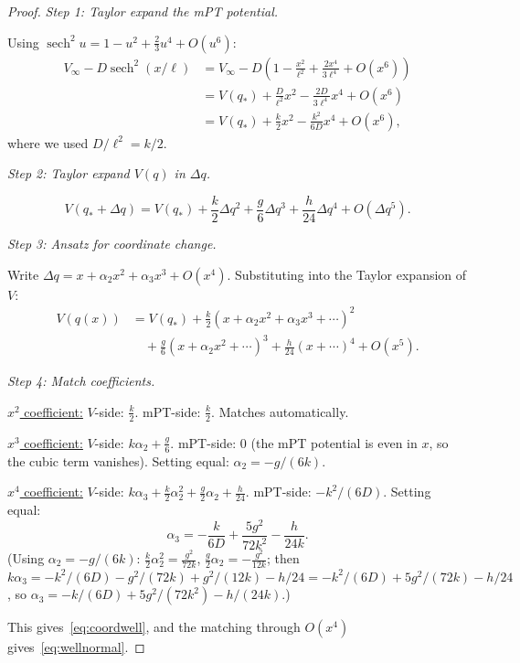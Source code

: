 \documentclass[12pt]{article}
\theoremstyle{plain}
\theoremstyle{definition}
\numberwithin{equation}{section}
\DeclareMathOperator{\sech}{sech}
\begin{document}
\begin{proof}
\emph{Step 1: Taylor expand the mPT potential.}

Using $\sech^2 u=1-u^2+\frac{2}{3}u^4+O(u^6)$:
\begin{align}
V_\infty-D\sech^2(x/\ell)
&= V_\infty-D\left(1-\frac{x^2}{\ell^2}
+\frac{2x^4}{3\ell^4}+O(x^6)\right)\\
&= V(q_*)+\frac{D}{\ell^2}x^2
-\frac{2D}{3\ell^4}x^4+O(x^6)\\
&= V(q_*)+\frac{k}{2}x^2-\frac{k^2}{6D}x^4+O(x^6),
\end{align}
where we used $D/\ell^2=k/2$.

\emph{Step 2: Taylor expand $V(q)$ in $\Delta q$.}

\begin{equation}
V(q_*+\Delta q) = V(q_*)+\frac{k}{2}\Delta q^2
+\frac{g}{6}\Delta q^3+\frac{h}{24}\Delta q^4+O(\Delta q^5).
\end{equation}

\emph{Step 3: Ansatz for coordinate change.}

Write $\Delta q=x+\alpha_2 x^2+\alpha_3 x^3+O(x^4)$.
Substituting into the Taylor expansion of $V$:
\begin{align}
V(q(x)) &= V(q_*)+\frac{k}{2}(x+\alpha_2 x^2+\alpha_3 x^3+\cdots)^2\\
&\quad+\frac{g}{6}(x+\alpha_2 x^2+\cdots)^3
+\frac{h}{24}(x+\cdots)^4+O(x^5).
\end{align}

\emph{Step 4: Match coefficients.}

\underline{$x^2$ coefficient:}
$V$-side: $\frac{k}{2}$.  mPT-side: $\frac{k}{2}$.  Matches
automatically.

\underline{$x^3$ coefficient:}
$V$-side: $k\alpha_2+\frac{g}{6}$.
mPT-side: $0$ (the mPT potential is even in $x$, so the cubic
term vanishes).
Setting equal: $\alpha_2=-g/(6k)$.

\underline{$x^4$ coefficient:}
$V$-side: $k\alpha_3+\frac{k}{2}\alpha_2^2
+\frac{g}{2}\alpha_2+\frac{h}{24}$.
mPT-side: $-k^2/(6D)$.
Setting equal:
\begin{equation}
\alpha_3 = -\frac{k}{6D}+\frac{5g^2}{72k^2}-\frac{h}{24k}.
\end{equation}
(Using $\alpha_2=-g/(6k)$:
$\frac{k}{2}\alpha_2^2=\frac{g^2}{72k}$,
$\frac{g}{2}\alpha_2=-\frac{g^2}{12k}$;
then $k\alpha_3=-k^2/(6D)-g^2/(72k)+g^2/(12k)-h/24
=-k^2/(6D)+5g^2/(72k)-h/24$,
so $\alpha_3=-k/(6D)+5g^2/(72k^2)-h/(24k)$.)

This gives~\eqref{eq:coordwell}, and the matching through
$O(x^4)$ gives~\eqref{eq:wellnormal}.
\end{proof}
\end{document}
